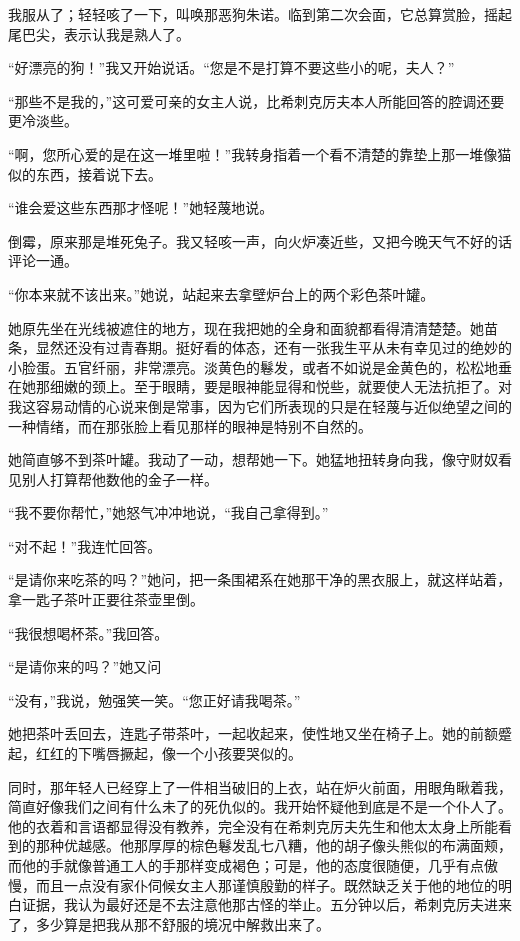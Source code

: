 \par 我服从了；轻轻咳了一下，叫唤那恶狗朱诺。临到第二次会面，它总算赏脸，摇起尾巴尖，表示认我是熟人了。
\par “好漂亮的狗！”我又开始说话。“您是不是打算不要这些小的呢，夫人？”
\par “那些不是我的，”这可爱可亲的女主人说，比希刺克厉夫本人所能回答的腔调还要更冷淡些。
\par “啊，您所心爱的是在这一堆里啦！”我转身指着一个看不清楚的靠垫上那一堆像猫似的东西，接着说下去。
\par “谁会爱这些东西那才怪呢！”她轻蔑地说。
\par 倒霉，原来那是堆死兔子。我又轻咳一声，向火炉凑近些，又把今晚天气不好的话评论一通。
\par “你本来就不该出来。”她说，站起来去拿壁炉台上的两个彩色茶叶罐。
\par 她原先坐在光线被遮住的地方，现在我把她的全身和面貌都看得清清楚楚。她苗条，显然还没有过青春期。挺好看的体态，还有一张我生平从未有幸见过的绝妙的小脸蛋。五官纤丽，非常漂亮。淡黄色的鬈发，或者不如说是金黄色的，松松地垂在她那细嫩的颈上。至于眼睛，要是眼神能显得和悦些，就要使人无法抗拒了。对我这容易动情的心说来倒是常事，因为它们所表现的只是在轻蔑与近似绝望之间的一种情绪，而在那张脸上看见那样的眼神是特别不自然的。
\par 她简直够不到茶叶罐。我动了一动，想帮她一下。她猛地扭转身向我，像守财奴看见别人打算帮他数他的金子一样。
\par “我不要你帮忙，”她怒气冲冲地说，“我自己拿得到。”
\par “对不起！”我连忙回答。
\par “是请你来吃茶的吗？”她问，把一条围裙系在她那干净的黑衣服上，就这样站着，拿一匙子茶叶正要往茶壶里倒。
\par “我很想喝杯茶。”我回答。
\par “是请你来的吗？”她又问
\par “没有，”我说，勉强笑一笑。“您正好请我喝茶。”
\par 她把茶叶丢回去，连匙子带茶叶，一起收起来，使性地又坐在椅子上。她的前额蹙起，红红的下嘴唇撅起，像一个小孩要哭似的。
\par 同时，那年轻人已经穿上了一件相当破旧的上衣，站在炉火前面，用眼角瞅着我，简直好像我们之间有什么未了的死仇似的。我开始怀疑他到底是不是一个仆人了。他的衣着和言语都显得没有教养，完全没有在希刺克厉夫先生和他太太身上所能看到的那种优越感。他那厚厚的棕色鬈发乱七八糟，他的胡子像头熊似的布满面颊，而他的手就像普通工人的手那样变成褐色；可是，他的态度很随便，几乎有点傲慢，而且一点没有家仆伺候女主人那谨慎殷勤的样子。既然缺乏关于他的地位的明白证据，我认为最好还是不去注意他那古怪的举止。五分钟以后，希刺克厉夫进来了，多少算是把我从那不舒服的境况中解救出来了。
